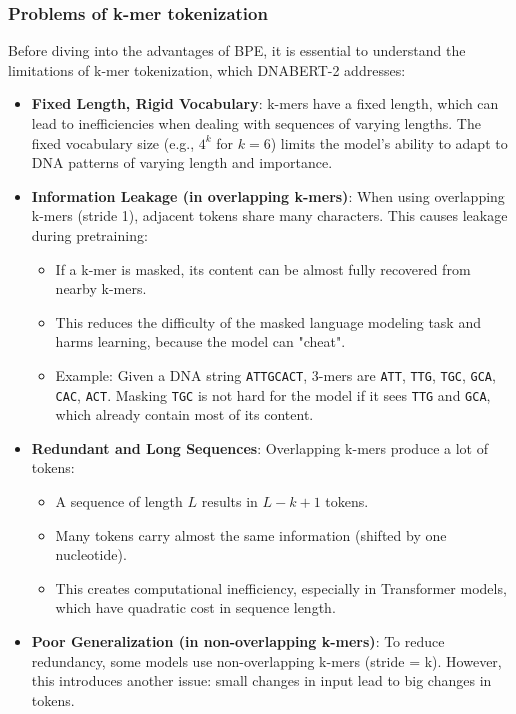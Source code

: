 \subsubsection{Problems of k-mer tokenization}
Before diving into the advantages of BPE, it is essential to understand the limitations of k-mer tokenization, which DNABERT-2 addresses:
\begin{itemize}
\item \textbf{Fixed Length, Rigid Vocabulary}: k-mers have a fixed length, which can lead to inefficiencies when dealing with sequences of varying lengths. The fixed vocabulary size (e.g., $4^k$ for $k=6$) limits the model's ability to adapt to DNA patterns of varying length and importance.
\item \textbf{Information Leakage (in overlapping k-mers)}: When using overlapping k-mers (stride 1), adjacent tokens share many characters. This causes leakage during pretraining:
\begin{itemize}
\item If a k-mer is masked, its content can be almost fully recovered from nearby k-mers.
\item This reduces the difficulty of the masked language modeling task and harms learning, because the model can "cheat".
\item Example: Given a DNA string \texttt{ATTGCACT}, 3-mers are \texttt{ATT}, \texttt{TTG}, \texttt{TGC}, \texttt{GCA}, \texttt{CAC}, \texttt{ACT}. Masking \texttt{TGC} is not hard for the model if it sees \texttt{TTG} and \texttt{GCA}, which already contain most of its content.
\end{itemize}
\item \textbf{Redundant and Long Sequences}: Overlapping k-mers produce a lot of tokens:
\begin{itemize}
\item A sequence of length $L$ results in $L-k+1$ tokens.
\item Many tokens carry almost the same information (shifted by one nucleotide).
\item This creates computational inefficiency, especially in Transformer models, which have quadratic cost in sequence length.
\end{itemize}
\item \textbf{Poor Generalization (in non-overlapping k-mers)}: To reduce redundancy, some models use non-overlapping k-mers (stride = k). However, this introduces another issue: small changes in input lead to big changes in tokens.
\begin{itemize}

\end{itemize}
\end{itemize}
